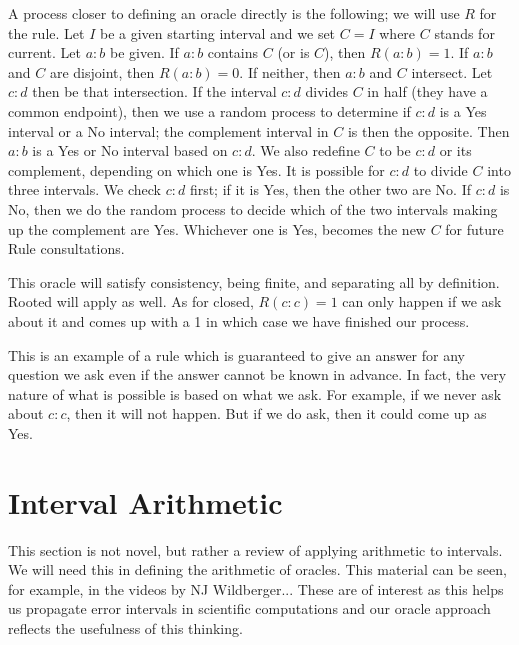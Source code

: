 \documentclass[12pt]{article}
\theoremstyle{remark}
\begin{document}
A process closer to defining an oracle directly is the following; we will use $R$ for the rule. Let $I$ be a given starting interval and we set $C=I$ where $C$ stands for current. Let $a:b$ be given. If $a:b$ contains $C$ (or is $C$), then $R(a:b) = 1$. If $a:b$ and $C$ are disjoint, then $R(a:b) = 0$. If neither, then $a:b$ and $C$ intersect. Let $c:d$ then be that intersection. If the interval $c:d$ divides $C$ in half (they have a common endpoint), then we use a random process to determine if $c:d$ is a Yes interval or a No interval; the complement interval in $C$ is then the opposite. Then $a:b$ is a Yes or No interval based on $c:d$. We also redefine $C$ to be $c:d$ or its complement, depending on which one is Yes. It is possible for $c:d$ to divide $C$ into three intervals. We check $c:d$ first; if it is Yes, then the other two are No. If $c:d$ is No, then we do the random process to decide which of the two intervals making up the complement are Yes. Whichever one is Yes, becomes the new $C$ for future Rule consultations.  

This oracle will satisfy consistency, being finite, and separating all by definition. Rooted will apply as well. As for closed, $R(c:c)=1$ can only happen if we ask about it and comes up with a 1 in which case we have finished our process. 

This is an example of a rule which is guaranteed to give an answer for any question we ask even if the answer cannot be known in advance. In fact, the very nature of what is possible is based on what we ask. For example, if we never ask about  $c:c$, then it will not happen. But if we do ask, then it could come up as Yes. 


\section{Interval Arithmetic}

This section is not novel, but rather a review of applying arithmetic to intervals. We will need this in defining the arithmetic of oracles. This material can be seen, for example, in the videos by NJ Wildberger... These are of interest as this helps us propagate error intervals in scientific computations and our oracle approach reflects the usefulness of this thinking. 
\end{document}
